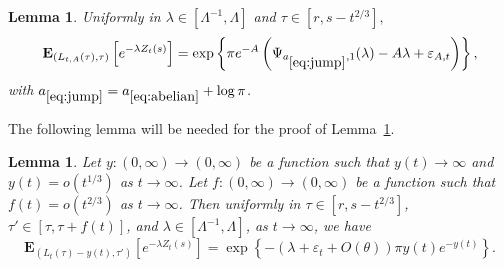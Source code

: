 \documentclass[10pt]{amsart}
\newtheorem{lemm}[theo]{Lemma}\newtheorem{prop}[theo]{Proposition}\newtheorem{coro}[theo]{Corollary}\newtheorem{conj}[theo]{Conjecture}
\theoremstyle{definition}\newtheorem{defi}[theo]{Definition}\newtheorem{rema}[theo]{Remark}\newtheorem{exam}[theo]{Example}\newtheorem{exem}[theo]{Example}\newtheorem{nota}[theo]{Notation}
\newcommand*\eps{\varepsilon}
\newcommand*\E{\mathbf{E}}
\newcommand{\1} {\mathds{1}}
\renewcommand*\to{\rightarrow}
\begin{document}
\begin{lemm}\label{lem:jump}
Uniformly in $\lambda \in [\Lambda^{-1},\Lambda]$ and $\tau\in[r,s-t^{2/3}],$
\begin{equation}\label{eq:jump}
\E_{\left(L_{t,A}(\tau),\tau\right)} \left[e^{-\lambda Z_t(s)}\right] =\exp \left\{\pi e^{-A}\left(\Psi_{a_{\eqref{eq:jump}},1}(\lambda) - A\lambda + \eps_{A,t}\right) \right\},
\end{equation}
with $a_{\eqref{eq:jump}} = a_{\eqref{eq:abelian}}+\log \pi$.
\end{lemm}

The following lemma will be needed for the proof of Lemma~\ref{lem:jump}.

\begin{lemm}\label{lem:deriv_appears}
Let $y: (0, \infty) \rightarrow (0, \infty)$ be a function such that $y(t)\to\infty$ and $y(t) = o(t^{1/3})$ as $t\to\infty$. Let $f: (0, \infty) \rightarrow (0, \infty)$ be a function such that $f(t) = o(t^{2/3})$ as $t\to\infty$. Then uniformly in $\tau\in[r,s-t^{2/3}]$, $\tau'\in [\tau,\tau+f(t)]$, and $\lambda \in [\Lambda^{-1},\Lambda]$, as $t\to\infty$, we have
\begin{equation}
\E_{\left(L_t(\tau)-y(t),\tau'\right)}\left[e^{-\lambda Z_t(s)}\right] = \exp\left\{-\left(\lambda+\eps_t+O(\theta)\right)\pi y(t)e^{-y(t)}\right\}.
\end{equation}
\end{lemm}
\end{document}
